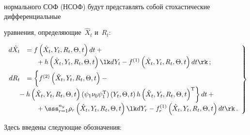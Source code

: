 нормального СОФ (НСОФ) будут представлять собой стохастические дифференциальные 

уравнения, определяющие~$\hat X_t$ и~$R_t$:

    \begin{equation}

    \left.

    \begin{array}{rl}

    d\hat X_t &= f \left(\hat X_t, Y_t,R_t,\Theta, t\right)dt +{}\\

  &\hspace*{5mm}{}+

    h\left(\hat X_t,Y_t, R_t,\Theta, t\right)\lk dY_t - f^{(1)} \left(\hat X_t,Y_t,

    R_t,\Theta, t\right)dt\rk\,; 

\\[6pt]

dR_t&=\left\{ 

\vphantom{\left({\hat X}_t, Y_t,R_t,\Theta, t\right)^{\mathrm{T}}}

f^{(2)}\left(\hat X_t, Y_t,R_t,\Theta, t\right)-{}\right.\\[6pt]

&\left.\hspace*{-5mm}{}- h\left(\hat  X_t, Y_t,R_t,\Theta, t\right)\pss \left(Y_t,\Theta, t\right) 

 h \left({\hat X}_t, Y_t,R_t,\Theta, t\right)^{\mathrm{T}}\right\} dt+{}\\[6pt]

 &\displaystyle\hspace*{5mm}{}+

\sss_{r=1}^{n_y} \rho_r \left({\hat X}_t,Y_t, R_t,\Theta, t\right)\lk

    dY_r -f_r^{(1)}\left({\hat X}_t,Y_t, R_t,\Theta, t\right) dt\rk\,.

    \end{array}

    \right\}

\label{e3.1-s1}


    \end{equation}

Здесь введены следующие обозначения:

